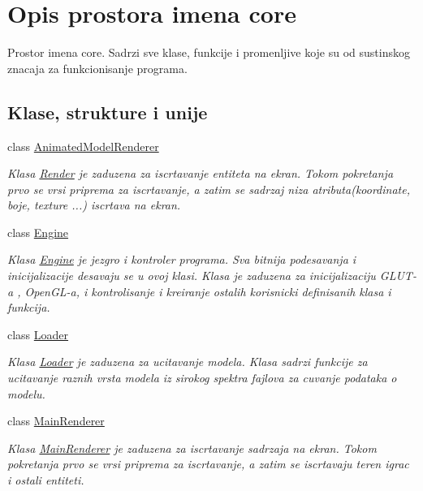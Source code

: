 \hypertarget{namespacecore}{}\section{Opis prostora imena core}
\label{namespacecore}


Prostor imena core. Sadrzi sve klase, funkcije i promenljive koje su od sustinskog znacaja za funkcionisanje programa.  


\subsection*{Klase, strukture i unije}
\begin{DoxyCompactItemize}
\item 
class \hyperlink{classcore_1_1AnimatedModelRenderer}{Animated\+Model\+Renderer}
\begin{DoxyCompactList}\small\item\em Klasa \hyperlink{classcore_1_1Render}{Render} je zaduzena za iscrtavanje entiteta na ekran. Tokom pokretanja prvo se vrsi priprema za iscrtavanje, a zatim se sadrzaj niza atributa(koordinate, boje, texture ...) iscrtava na ekran. \end{DoxyCompactList}\item 
class \hyperlink{classcore_1_1Engine}{Engine}
\begin{DoxyCompactList}\small\item\em Klasa \hyperlink{classcore_1_1Engine}{Engine} je jezgro i kontroler programa. Sva bitnija podesavanja i inicijalizacije desavaju se u ovoj klasi. Klasa je zaduzena za inicijalizaciju G\+L\+U\+T-\/a , Open\+G\+L-\/a, i kontrolisanje i kreiranje ostalih korisnicki definisanih klasa i funkcija. \end{DoxyCompactList}\item 
class \hyperlink{classcore_1_1Loader}{Loader}
\begin{DoxyCompactList}\small\item\em Klasa \hyperlink{classcore_1_1Loader}{Loader} je zaduzena za ucitavanje modela. Klasa sadrzi funkcije za ucitavanje raznih vrsta modela iz sirokog spektra fajlova za cuvanje podataka o modelu. \end{DoxyCompactList}\item 
class \hyperlink{classcore_1_1MainRenderer}{Main\+Renderer}
\begin{DoxyCompactList}\small\item\em Klasa \hyperlink{classcore_1_1MainRenderer}{Main\+Renderer} je zaduzena za iscrtavanje sadrzaja na ekran. Tokom pokretanja prvo se vrsi priprema za iscrtavanje, a zatim se iscrtavaju teren igrac i ostali entiteti. \end{DoxyCompactList}\item 

\end{DoxyCompactItemize}
